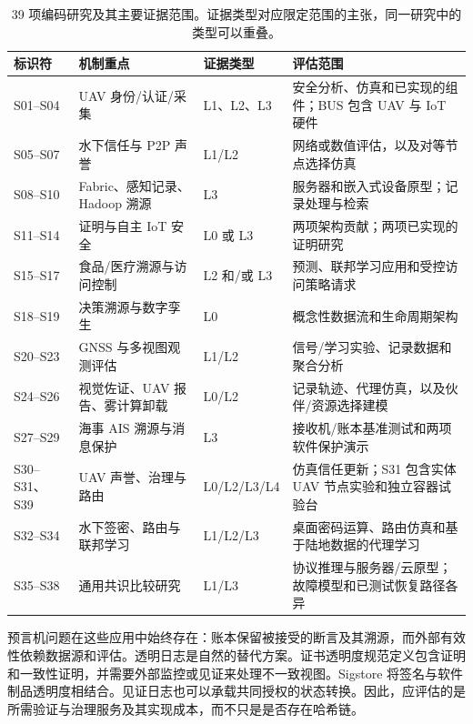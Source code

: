 \begin{table}[H]\footnotesize
\caption{39 项编码研究及其主要证据范围。证据类型对应限定范围的主张，同一研究中的类型可以重叠。}\label{tab:reviews}
\begin{tabularx}{\textwidth}{@{}P{22mm}P{52mm}P{21mm}Y@{}}\toprule
\textbf{标识符} & \textbf{机制重点} & \textbf{证据类型} & \textbf{评估范围}\\\midrule
S01--S04 & UAV 身份/认证/采集\citep{han2022identity,tan2022blockchain,karmakar2024blockchain,islam2019bus} & L1、L2、L3 & 安全分析、仿真和已实现的组件；BUS 包含 UAV 与 IoT 硬件\\
S05--S07 & 水下信任与 P2P 声誉\citep{jiang2020dynamic,arifeen2020hidden,kamvar2003eigentrust} & L1/L2 & 网络或数值评估，以及对等节点选择仿真\\
S08--S10 & Fabric、感知记录、Hadoop 溯源\citep{androulaki2018hyperledger,hang2019design,honarpajooh2021iot} & L3 & 服务器和嵌入式设备原型；记录处理与检索\\
S11--S14 & 证明与自主 IoT 安全\citep{hardjono2021towards,ott2023universal,figueiredo2022arcadian,baciu2025secure} & L0 或 L3 & 两项架构贡献；两项已实现的证明研究\\
S15--S17 & 食品/医疗溯源与访问控制\citep{khan2020iot,rahman2020secure,liu2020fabric} & L2 和/或 L3 & 预测、联邦学习应用和受控访问策略请求\\
S18--S19 & 决策溯源与数字孪生\citep{singh2019decision,suhail2022trustworthy} & L0 & 概念性数据流和生命周期架构\\
S20--S23 & GNSS 与多视图观测评估\citep{shafique2021detecting,dang2022deep,semanjski2020use,liu2022trusted} & L1/L2 & 信号/学习实验、记录数据和聚合分析\\
S24--S26 & 视觉佐证、UAV 报告、雾计算卸载\citep{varshosaz2019spoofing,garcamagario2019security,alkhafajiy2020comitment} & L0/L2 & 记录轨迹、代理仿真，以及伙伴/资源选择建模\\
S27--S29 & 海事 AIS 溯源与消息保护\citep{maritime2022monitoring,kessler2020protected,goudossis2022secais} & L3 & 接收机/账本基准测试和两项软件保护演示\\
S30--S31、S39 & UAV 声誉、治理与路由\citep{hierarchical2023trust,yang2023trusted,barka2022towards} & L0/L2/L3/L4 & 仿真信任更新；S31 包含实体 UAV 节点实验和独立容器试验台\\
S32--S34 & 水下签密、路由与联邦学习\citep{zhang2026underwater,eetauv2025trust,tafl2026underwater} & L1/L2/L3 & 桌面密码运算、路由仿真和基于陆地数据的代理学习\\
S35--S38 & 通用共识比较研究\citep{hotstuff2019,narwhal2022,raft2014,pbft1999} & L1/L3 & 协议推理与服务器/云原型；故障模型和已测试恢复路径各异\\\bottomrule
\end{tabularx}\end{table}

预言机问题在这些应用中始终存在：账本保留被接受的断言及其溯源，而外部有效性依赖数据源和评估\citep{caldarelli2020oracle,albreiki2020oracles}。透明日志是自然的替代方案。证书透明度规范定义包含证明和一致性证明，并需要外部监控或见证来处理不一致视图\citep{rfc6962,rfc9162}。Sigstore 将签名与软件制品透明度相结合\citep{sigstore2022}。见证日志也可以承载共同授权的状态转换。因此，应评估的是所需验证与治理服务及其实现成本，而不只是是否存在哈希链。
